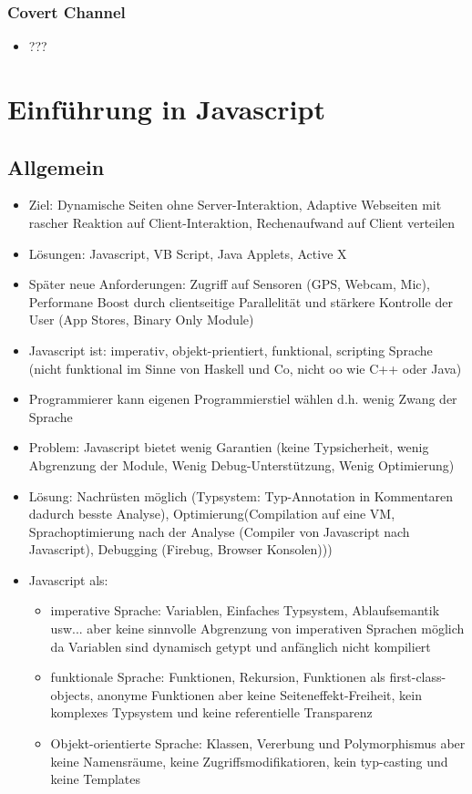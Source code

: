 \documentclass{article} %
\begin{document}
	\subsubsection{Covert Channel}
	\begin{itemize}
		\item ???
	\end{itemize}
	\section{Einführung in Javascript}
	\subsection{Allgemein}
	\begin{itemize}
		\item Ziel: Dynamische Seiten ohne Server-Interaktion, Adaptive Webseiten mit rascher Reaktion auf Client-Interaktion, Rechenaufwand auf Client verteilen
		\item Lösungen: Javascript, VB Script, Java Applets, Active X
		\item Später neue Anforderungen: Zugriff auf Sensoren (GPS, Webcam, Mic), Performane Boost durch clientseitige Parallelität und stärkere Kontrolle der User (App Stores, Binary Only Module)
		\item Javascript ist: imperativ, objekt-prientiert, funktional, scripting Sprache (nicht funktional im Sinne von Haskell und Co, nicht oo wie C++ oder Java)
		\item Programmierer kann eigenen Programmierstiel wählen d.h. wenig Zwang der Sprache
		\item Problem: Javascript bietet wenig Garantien (keine Typsicherheit, wenig Abgrenzung der Module, Wenig Debug-Unterstützung, Wenig Optimierung)
		\item Lösung: Nachrüsten möglich (Typsystem: Typ-Annotation in Kommentaren dadurch besste Analyse), Optimierung(Compilation auf eine VM, Sprachoptimierung nach der Analyse (Compiler von Javascript nach Javascript), Debugging (Firebug, Browser Konsolen)))	
		\item Javascript als:
		\begin{itemize}
			\item imperative Sprache: Variablen, Einfaches Typsystem, Ablaufsemantik usw... aber keine sinnvolle Abgrenzung von imperativen Sprachen möglich da Variablen sind dynamisch getypt und anfänglich nicht kompiliert
			\item funktionale Sprache: Funktionen, Rekursion, Funktionen als first-class-objects, anonyme Funktionen aber keine Seiteneffekt-Freiheit, kein komplexes Typsystem und keine referentielle Transparenz
			\item Objekt-orientierte Sprache: Klassen, Vererbung und Polymorphismus aber keine Namensräume, keine Zugriffsmodifikatioren, kein typ-casting und keine Templates
		\end{itemize}
	\end{itemize}
\end{document}
